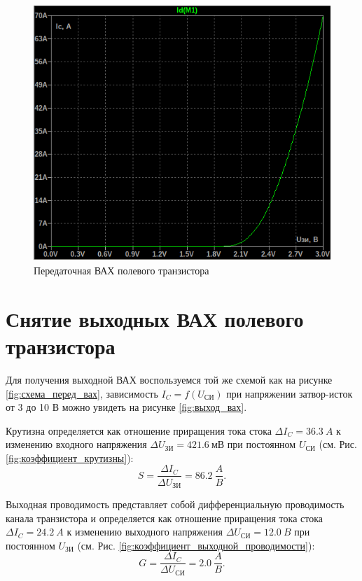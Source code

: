 \begin{figure}[H]
    \centering
    \includegraphics[width=0.8\linewidth]{figs/task_1_перед_хар.png}
    \caption{Передаточная ВАХ полевого транзистора}
    \label{fig:перед_вах}
\end{figure}



\section*{Снятие выходных ВАХ полевого транзистора}

Для получения выходной ВАХ воспользуемся той же схемой как на рисунке \ref{fig:схема_перед_вах},
зависимость $I_C=f(U_\text{СИ})$ при напряжении затвор-исток от 3 до 10 В можно
увидеть на рисунке \ref{fig:выход_вах}.

Крутизна определяется как отношение приращения тока стока $\Delta I_C=36.3\ A$ к изменению 
входного напряжения $\Delta U_\text{ЗИ}=421.6\ \text{мВ}$ при постоянном $U_\text{СИ}$
(см. Рис. \ref{fig:коэффициент_крутизны}):
\begin{equation*}
    S=\frac{\Delta I_C}{\Delta U_\text{ЗИ}}=86.2\ \frac{A}{B}.
\end{equation*}

Выходная проводимость представляет собой
дифференциальную проводимость канала транзистора и
определяется как отношение приращения тока стока $\Delta I_C=24.2\ A$ к
изменению выходного напряжения $\Delta U_\text{СИ}=12.0\ B$ при постоянном $U_\text{ЗИ}$
(см. Рис. \ref{fig:коэффициент_выходной_проводимости}):
\begin{equation*}
    G=\frac{\Delta I_C}{\Delta U_\text{СИ}}=2.0\ \frac{A}{B}.
\end{equation*}

